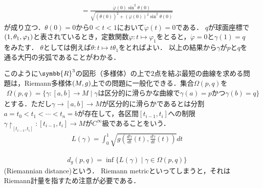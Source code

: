 \documentclass{ltjsbook}
\begin{document}
\begin{specialexample}
\begin{align*}
    =
    \frac{\dot{\varphi}(0) \sin^2\theta(0)}{\sqrt{(\dot{\theta}(0))^2 + (\dot{\varphi}(0))^2 \sin^2 \theta(0)}}
\end{align*}
が成り立つ．\(\theta(0) = 0\)から\(0 < t < 1\)において\(\dot{\varphi}(t) = 0\)である．
\(q\)が球面座標で\((1, \theta_1, \varphi_1)\)と表されているとき，定数関数\(\varphi\colon t \mapsto \varphi_1\)をとると，\(\dot{\varphi} = 0\)と\(\gamma(1) = q\)をみたす．
\(\theta\)としては例えば\(\theta\colon t \mapsto t \theta_1\)をとればよい．
以上の結果から\(\gamma\)が\(p\)と\(q\)を通る大円の劣弧であることがわかる．

このように\(\symbb{R}^3\)の図形（多様体）の上で\(2\)点を結ぶ最短の曲線を求める問題は，Riemann多様体\((M, g)\)上での問題に一般化できる．集合\(\Omega(p, q)\)を
\begin{align*}
    \Omega(p, q) = \{%
        \gamma\colon [a, b] \to M \mid
        \text{\(\gamma\)は区分的に滑らかな曲線で\(\gamma(a) = p\)かつ\(\gamma(b) = q\)}
    \}
\end{align*}
とする．ただし\(\gamma\to [a, b] \to M\)が区分的に滑らかであるとは分割\(a = t_0 < t_1 < \cdots < t_n = b\)が存在して，各区間\([t_{i - 1}, t_i]\)への制限\(\gamma\restriction_{[t_{i - 1}, t_{i}]}\colon [t_{i - 1}, t_i] \to M\)が\(C^\infty\)級であることをいう．
\begin{align*}
    L(\gamma) = \int_{0}^{1} \sqrt{g\left(\frac{d\gamma}{dt}(t), \frac{d\gamma}{dt}(t)\right)} dt
\end{align*}

\begin{align}
    d_g(p, q) = \inf \{L(\gamma) \mid \gamma \in \Omega(p, q)\}
\end{align}
(Riemannian distance)という．
Riemann metricといってしまうと，それはRiemann計量を指すため注意が必要である．



\end{specialexample}
\end{document}
